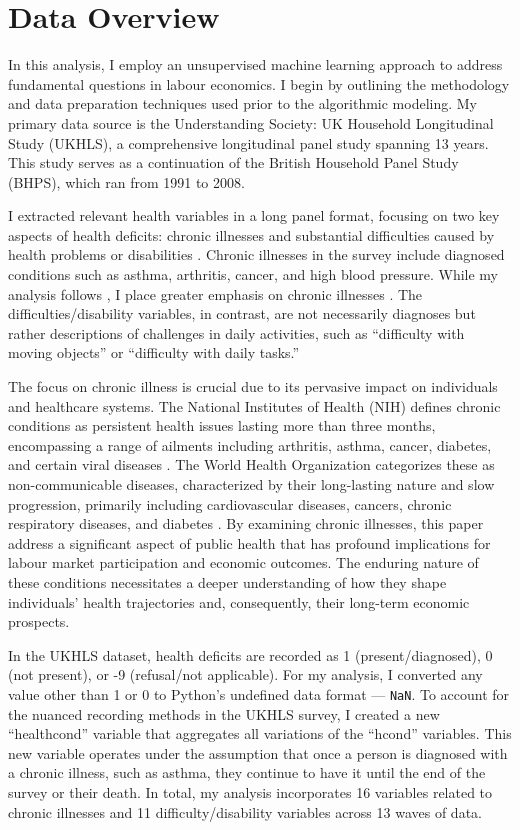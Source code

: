 \section{Data Overview}
In this analysis, I employ an unsupervised machine learning approach to address fundamental questions in labour economics. I begin by outlining the methodology and data preparation techniques used prior to the algorithmic modeling. My primary data source is the Understanding Society: UK Household Longitudinal Study (UKHLS), a comprehensive longitudinal panel study spanning 13 years. This study serves as a continuation of the British Household Panel Study (BHPS), which ran from 1991 to 2008.

I extracted relevant health variables in a long panel format, focusing on two key aspects of health deficits: chronic illnesses and substantial difficulties caused by health problems or disabilities \citep{ukhls_disdif6}. Chronic illnesses in the survey include diagnosed conditions such as asthma, arthritis, cancer, and high blood pressure. While my analysis follows \citet{denardi2024wp}, I place greater emphasis on chronic illnesses \citep{borella_nber}. The difficulties/disability variables, in contrast, are not necessarily diagnoses but rather descriptions of challenges in daily activities, such as ``difficulty with moving objects'' or ``difficulty with daily tasks.''

The focus on chronic illness is crucial due to its pervasive impact on individuals and healthcare systems. The National Institutes of Health (NIH) defines chronic conditions as persistent health issues lasting more than three months, encompassing a range of ailments including arthritis, asthma, cancer, diabetes, and certain viral diseases \citep{bernell2016}. The World Health Organization categorizes these as non-communicable diseases, characterized by their long-lasting nature and slow progression, primarily including cardiovascular diseases, cancers, chronic respiratory diseases, and diabetes \citep{who_ncd}. By examining chronic illnesses, this paper address a significant aspect of public health that has profound implications for labour market participation and economic outcomes. The enduring nature of these conditions necessitates a deeper understanding of how they shape individuals' health trajectories and, consequently, their long-term economic prospects.

In the UKHLS dataset, health deficits are recorded as 1 (present/diagnosed), 0 (not present), or -9 (refusal/not applicable). For my analysis, I converted any value other than 1 or 0 to Python's undefined data format --- \texttt{NaN}. To account for the nuanced recording methods in the UKHLS survey, I created a new ``healthcond'' variable that aggregates all variations of the ``hcond'' variables. This new variable operates under the assumption that once a person is diagnosed with a chronic illness, such as asthma, they continue to have it until the end of the survey or their death. In total, my analysis incorporates 16 variables related to chronic illnesses and 11 difficulty/disability variables across 13 waves of data.


